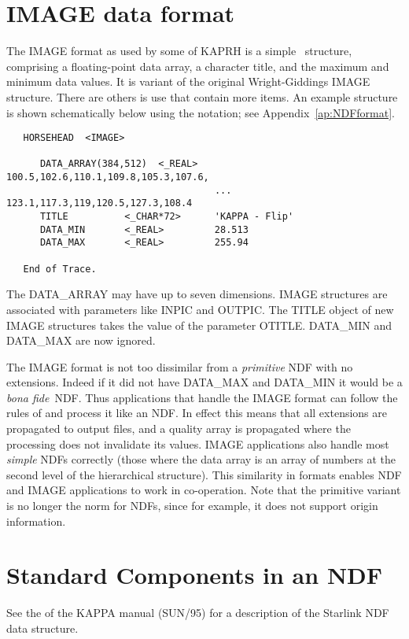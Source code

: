 \documentclass[twoside,11pt,nolof]{starlink}
\providecommand{\latexelsehtml}[2]{#1}
\providecommand{\HDSref}{\xref{HDS}{sun92}{}}
\providecommand{\HDSTRACEref}{\xref{{\footnotesize HDSTRACE}}{sun102}{}}
\begin{document}
\newpage
\section{IMAGE data format\label{ap:IMAGEformat}}

The IMAGE format as used by some of {\footnotesize KAPRH} is a simple
\HDSref\ structure, comprising a floating-point data array, a character title,
and the maximum and minimum data values.  It is variant of the
original Wright-Giddings IMAGE structure.  There are others is use
that contain more items. An example structure is shown schematically
below using the \HDSTRACEref{} notation; see
\latexelsehtml{Appendix~\ref{ap:NDFformat}}{\htmlref{the NDF format}{ap:NDFformat}}.
\begin{verbatim}
   HORSEHEAD  <IMAGE>

      DATA_ARRAY(384,512)  <_REAL>   100.5,102.6,110.1,109.8,105.3,107.6,
                                     ... 123.1,117.3,119,120.5,127.3,108.4
      TITLE          <_CHAR*72>      'KAPPA - Flip'
      DATA_MIN       <_REAL>         28.513
      DATA_MAX       <_REAL>         255.94

   End of Trace.
\end{verbatim}

The DATA\_ARRAY may have up to seven dimensions.
IMAGE structures are associated with parameters like INPIC and OUTPIC.
The TITLE object of new IMAGE structures takes the value of the
parameter OTITLE.  DATA\_MIN and DATA\_MAX are now ignored.

The IMAGE format is not too dissimilar from a \emph{primitive\/} NDF
with no extensions.  Indeed if it did not have DATA\_MAX and DATA\_MIN
it would be a {\it bona fide}\ NDF.  Thus applications that handle the
IMAGE format can follow the rules of  and
process it like an NDF.  In effect this means that all extensions are
propagated to output files, and a quality array is propagated where
the processing does not invalidate its values.  IMAGE applications
also handle most \emph{simple\/} NDFs correctly (those where the data
array is an array of numbers at the second level of the hierarchical
structure).  This similarity in formats enables NDF and IMAGE
applications to work in co-operation. Note that the primitive
variant is no longer the norm for NDFs, since for example, it does not
support origin information.

\section{Standard Components in an NDF\label{ap:NDFformat}}
See the  of the KAPPA manual (SUN/95)
for a description of the Starlink NDF data structure.
\end{document}
